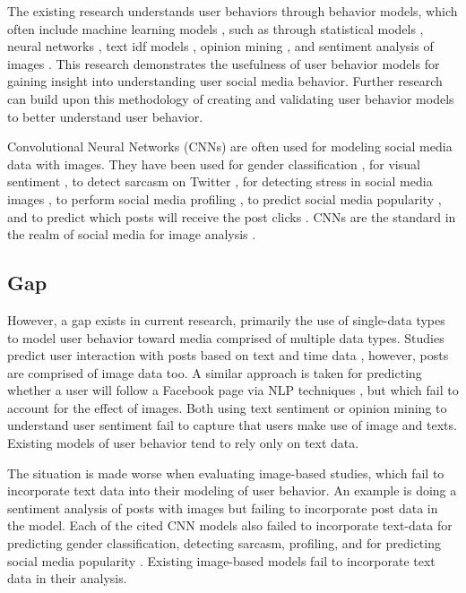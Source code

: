 \documentclass{article}
\begin{document}
The existing research understands user behaviors through behavior models, which often include machine learning models \cite{Li_et_al_2015, 8029313, Ohsawa2013, Liu2012, Li2015}, such as through statistical models \cite{Li_et_al_2015}, neural networks \cite{8029313}, text idf models \cite{Ohsawa2013}, opinion mining \cite{Liu2012}, and sentiment analysis of images \cite{Wang2015}. This research demonstrates the usefulness of user behavior models for gaining insight into understanding user social media behavior. Further research can build upon this methodology of creating and validating user behavior models to better understand user behavior.

Convolutional Neural Networks (CNNs) are often used for modeling social media data with images.  They have been used for gender classification \cite{Hassner2015}, for visual sentiment \cite{Segalin2017, Xu2014}, to detect sarcasm on Twitter \cite{Poria2016}, for detecting stress in social media images \cite{Lin2014}, to perform social media profiling \cite{Segalin2017}, to predict social media popularity \cite{Gelli2015}, and to predict which posts will receive the post clicks \cite{Khosla2014}. CNNs are the standard in the realm of social media for image analysis \cite{Hassner2015}. 

\subsection{Gap}

However, a gap exists in current research, primarily the use of single-data types to model user behavior toward media comprised of multiple data types. Studies predict user interaction with posts based on text and time data \cite{8029313}, however, posts are comprised of image data too. A similar approach is taken for predicting whether a user will follow a Facebook page via NLP techniques \cite{Ohsawa2013}, but which fail to account for the effect of images.  Both using text sentiment or opinion mining \cite{Liu2012} to understand user sentiment fail to capture that users make use of image and texts. Existing models of user behavior tend to rely only on text data.

The situation is made worse when evaluating image-based studies, which fail to incorporate text data into their modeling of user behavior. An example is doing a sentiment analysis of posts with images \cite{Wang2015} but failing to incorporate post data in the model. Each of the cited CNN models also failed to incorporate text-data for predicting gender classification, detecting sarcasm, profiling, and for predicting social media popularity \cite{Hassner2015, Poria2016, Segalin2017, Gelli2015}. Existing image-based models fail to incorporate text data in their analysis.
\end{document}
